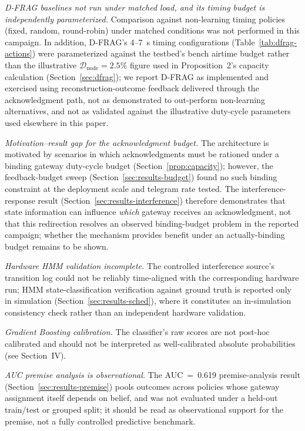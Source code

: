 \documentclass[journal]{IEEEtran}
\begin{document}
\textit{D-FRAG baselines not run under matched load, and its timing budget is independently parameterized.} Comparison against non-learning timing policies (fixed, random, round-robin) under matched conditions was not performed in this campaign. In addition, D-FRAG's 4--7~s timing configurations (Table~\ref{tab:dfrag-actions}) were parameterized against the testbed's bench airtime budget rather than the illustrative $\mathcal{D}_{\text{node}}=2.5\%$ figure used in Proposition~2's capacity calculation (Section~\ref{sec:dfrag}); we report D-FRAG as implemented and exercised using reconstruction-outcome feedback delivered through the acknowledgment path, not as demonstrated to out-perform non-learning alternatives, and not as validated against the illustrative duty-cycle parameters used elsewhere in this paper.

\textit{Motivation--result gap for the acknowledgment budget.} The architecture is motivated by scenarios in which acknowledgments must be rationed under a binding gateway duty-cycle budget (Section~\ref{prop:capacity}); however, the feedback-budget sweep (Section~\ref{sec:results-budget}) found no such binding constraint at the deployment scale and telegram rate tested. The interference-response result (Section~\ref{sec:results-interference}) therefore demonstrates that state information can influence \emph{which} gateway receives an acknowledgment, not that this redirection resolves an observed binding-budget problem in the reported campaign; whether the mechanism provides benefit under an actually-binding budget remains to be shown.

\textit{Hardware HMM validation incomplete.} The controlled interference source's transition log could not be reliably time-aligned with the corresponding hardware run; HMM state-classification verification against ground truth is reported only in simulation (Section~\ref{sec:results-sched}), where it constitutes an in-simulation consistency check rather than an independent hardware validation.

\textit{Gradient Boosting calibration.} The classifier's raw scores are not post-hoc calibrated and should not be interpreted as well-calibrated absolute probabilities (see Section~IV).

\textit{AUC premise analysis is observational.} The AUC~=~0.619 premise-analysis result (Section~\ref{sec:results-premise}) pools outcomes across policies whose gateway assignment itself depends on belief, and was not evaluated under a held-out train/test or grouped split; it should be read as observational support for the premise, not a fully controlled predictive benchmark.
\end{document}
